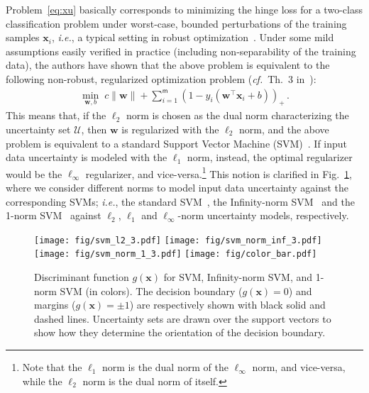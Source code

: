 \documentclass[runningheads,a4paper]{llncs}
\newcommand{\ie}{\emph{i.e.}}
\newcommand{\cf}{\emph{cf.}}
\newcommand{\vct}[1]{\ensuremath{\boldsymbol{#1}}}
\newcommand{\set}[1]{\ensuremath{\mathcal{#1}}}
\newcommand{\con}[1]{\ensuremath{\mathsf{#1}}}
\newcommand{\T}{\ensuremath{\top}}
\begin{document}
Problem~\eqref{eq:xu} basically corresponds to minimizing the hinge loss for a two-class classification problem under worst-case, bounded perturbations of the training samples $\vct x_{i}$, \ie, a typical setting in robust optimization~\cite{xu09,sra11,livni12}.
%
Under some mild assumptions easily verified in practice (including non-separability of the training data), the authors have shown that the above problem is equivalent to the following non-robust, regularized optimization problem (\cf~Th.~3 in~\cite{xu09}):
\begin{eqnarray}
 \min_{\vct w,b} \;  c \| \vct w \| + \sum_{i=1}^{\con m} \left(1- y_i( \vct w^{\T} \vct x_i  + b)\right)_{+} \,.
\end{eqnarray}
This means that, if the $\ell_{2}$ norm is chosen as the dual norm characterizing the uncertainty set $\set U$, then $\vct w$ is regularized with the $\ell_{2}$ norm, and the above problem is equivalent to a standard Support Vector Machine (SVM)~\cite{vapnik95}.
If input data uncertainty is modeled with the $\ell_{1}$ norm, instead, the optimal regularizer would be the $\ell_{\infty}$ regularizer, and vice-versa.\footnote{Note that the $\ell_{1}$ norm is the dual norm of the $\ell_{\infty}$ norm, and vice-versa, while the $\ell_{2}$ norm is the dual norm of itself.}
This notion is clarified in Fig.~\ref{fig:dual_norm}, where we consider different norms to model input data uncertainty against the corresponding SVMs; \ie, the standard SVM~\cite{vapnik95}, the Infinity-norm SVM~\cite{bennett00} and the 1-norm SVM~\cite{zhu04-nips} against $\ell_{2}$, $\ell_{1}$ and $\ell_{\infty}$-norm uncertainty models, respectively. 


\begin{figure}[t]
	\centering
	\texttt{[image: fig/svm\_l2\_3.pdf]}
	\texttt{[image: fig/svm\_norm\_inf\_3.pdf]}		
	\texttt{[image: fig/svm\_norm\_1\_3.pdf]}
	\texttt{[image: fig/color\_bar.pdf]}
	\caption{Discriminant function $g(\vct x)$ for SVM, Infinity-norm SVM, and 1-norm SVM (in colors). The decision boundary ($g(\vct x)=0$) and margins ($g(\vct x) =\pm 1$) are respectively shown with black solid and dashed lines. Uncertainty sets are drawn over the support vectors to show how they determine the orientation of the decision boundary.}
	\label{fig:dual_norm}
\end{figure}
\end{document}
